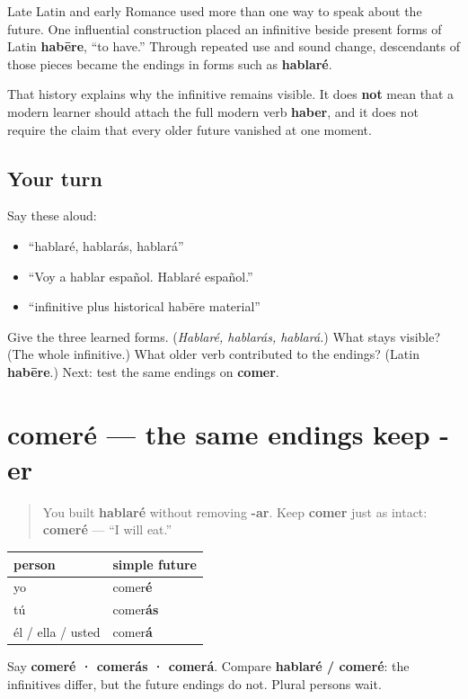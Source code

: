 \begin{cousinweb}
Late Latin and early Romance used more than one way to speak about the future. One influential construction placed an infinitive beside present forms of Latin \textbf{habēre}, “to have.” Through repeated use and sound change, descendants of those pieces became the endings in forms such as \textbf{hablaré}.

That history explains why the infinitive remains visible. It does \textbf{not} mean that a modern learner should attach the full modern verb \textbf{haber}, and it does not require the claim that every older future vanished at one moment.
\end{cousinweb}

\subsection*{Your turn}
Say these aloud:

\begin{itemize}
\raggedright
  \item “hablaré, hablarás, hablará”
  \item “Voy a hablar español. Hablaré español.”
  \item “infinitive plus historical habēre material”
\end{itemize}

\begin{tcolorbox}[breakable,colback=teal!4,colframe=teal!35!black,title={Before you move on}]
Give the three learned forms. (\emph{Hablaré, hablarás, hablará.}) What stays visible? (The whole infinitive.) What older verb contributed to the endings? (Latin \textbf{habēre}.) Next: test the same endings on \textbf{comer}.
\end{tcolorbox}
\section[comeré]{comeré — the same endings keep -er}

\label{lesson:ES-C17-comer-futuro}



\begin{quote}
You built \textbf{hablaré} without removing \textbf{-ar}. Keep \textbf{comer} just as intact: \textbf{comeré} — “I will eat.”
\end{quote}

\begin{grammarlens}[title={Grammar Lens: the singular -er row}]
\noindent
\begin{tabularx}{\linewidth}{@{}>{\raggedright\arraybackslash}X>{\raggedright\arraybackslash}X@{}}
\toprule
\textbf{person} & \textbf{simple future} \\
\midrule
yo & comer\textbf{é} \\
tú & comer\textbf{ás} \\
él / ella / usted & comer\textbf{á} \\
\bottomrule
\end{tabularx}

Say \textbf{comeré · comerás · comerá}. Compare \textbf{hablaré / comeré}: the infinitives differ, but the future endings do not. Plural persons wait.
\end{grammarlens}

